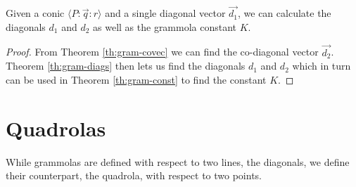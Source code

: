 \begin{corollary}
Given a conic $\langle P\!:\!\vec{q}\!:\!r \rangle$ and a single diagonal vector $\vec{d_1}$, we can calculate the diagonals $d_1$ and $d_2$ as well as the grammola constant $K$.
\end{corollary}
\begin{proof}
From Theorem \ref{th:gram-covec} we can find the co-diagonal vector $\vec{d_2}$. Theorem \ref{th:gram-diags} then lets us find the diagonals $d_1$ and $d_2$ which in turn can be used in Theorem \ref{th:gram-const} to find the constant $K$.
\end{proof}


\section{Quadrolas}

While grammolas are defined with respect to two lines, the diagonals, we define their counterpart, the quadrola, with respect to two points.

